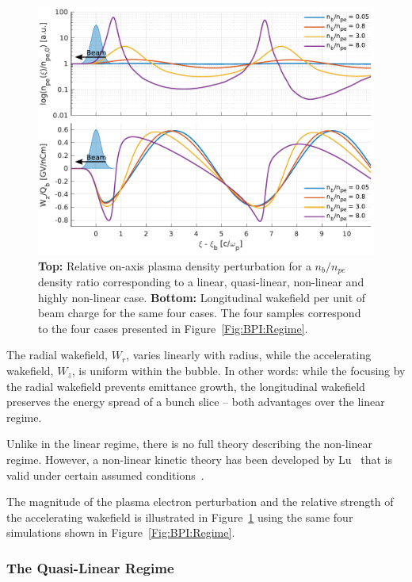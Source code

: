 \begin{figure}[hbt]
    \centering
    \includegraphics[width=0.875\linewidth,trim={0mm 0mm 0mm 0mm},clip]{figures/Density}
    \caption{\label{Fig:BPI:Density}
        \textbf{Top:} Relative on-axis plasma density perturbation for a $n_{b}/n_{pe}$ density ratio corresponding to a linear, quasi-linear, non-linear and highly non-linear case.
        \textbf{Bottom:} Longitudinal wakefield per unit of beam charge for the same four cases.
        The four samples correspond to the four cases presented in Figure~\ref{Fig:BPI:Regime}.
    }
\end{figure}

The radial wakefield, $W_{r}$, varies linearly with radius, while the accelerating wakefield, $W_{z}$, is uniform within the bubble.
In other words: while the focusing by the radial wakefield prevents emittance growth, the longitudinal wakefield preserves the energy spread of a bunch slice -- both advantages over the linear regime.

Unlike in the linear regime, there is no full theory describing the non-linear regime.
However, a non-linear kinetic theory has been developed by Lu \etal ~that is valid under certain assumed conditions~\cite{lu:2006a,lu:2006}.

The magnitude of the plasma electron perturbation and the relative strength of the accelerating wakefield is illustrated in Figure~\ref{Fig:BPI:Density} using the same four simulations shown in Figure~\ref{Fig:BPI:Regime}.

\subsubsection{The Quasi-Linear Regime}
\label{Int:BPI:QLin}

